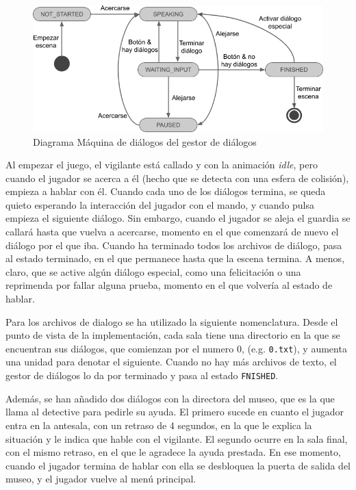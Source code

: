 \begin{figure}[!h]
\begin{center}
\includegraphics[width=1\textwidth]{imagenes/7/maquina-estados-dialogos.png}
\caption{Diagrama Máquina de diálogos del gestor de diálogos}
\label{fig:dialogs-state-machine}
\end{center}
\end{figure}

Al empezar el juego, el vigilante está callado y con la animación \textit{idle}, pero cuando el jugador se acerca a él (hecho que se detecta con una esfera de colisión), empieza a hablar con él. Cuando cada uno de los diálogos termina, se queda quieto esperando la interacción del jugador con el mando, y cuando pulsa empieza el siguiente diálogo. Sin embargo, cuando el jugador se aleja el guardia se callará hasta que vuelva a acercarse, momento en el que comenzará de nuevo el diálogo por el que iba. Cuando ha terminado todos los archivos de diálogo, pasa al estado terminado, en el que permanece hasta que la escena termina. A menos, claro, que se active algún diálogo especial, como una felicitación o una reprimenda por fallar alguna prueba, momento en el que volvería al estado de hablar.

Para los archivos de dialogo se ha utilizado la siguiente nomenclatura. Desde el punto de vista de la implementación, cada sala tiene una directorio en la que se encuentran sus diálogos, que comienzan por el numero 0, (e.g. \texttt{0.txt}), y aumenta una unidad para denotar el siguiente. Cuando no hay más archivos de texto, el gestor de diálogos lo da por terminado y pasa al estado \texttt{FNISHED}.

Además, se han añadido dos diálogos con la directora del museo, que es la que llama al detective para pedirle su ayuda. El primero sucede en cuanto el jugador entra en la antesala, con un retraso de 4 segundos, en la que le explica la situación y le indica que hable con el vigilante. El segundo ocurre en la sala final, con el mismo retraso, en el que le agradece la ayuda prestada. En ese momento, cuando el jugador termina de hablar con ella se desbloquea la puerta de salida del museo, y el jugador vuelve al menú principal.

